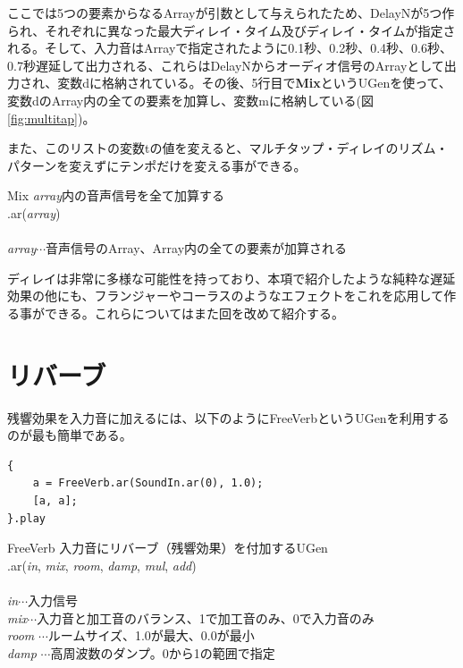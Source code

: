 \documentclass{jsarticle}
\begin{document}
ここでは5つの要素からなるArrayが引数として与えられたため、DelayNが5つ作られ、それぞれに異なった最大ディレイ・タイム及びディレイ・タイムが指定される。そして、入力音はArrayで指定されたように0.1秒、0.2秒、0.4秒、0.6秒、0.7秒遅延して出力される、これらはDelayNからオーディオ信号のArrayとして出力され、変数dに格納されている。その後、5行目で{\bf Mix}というUGenを使って、変数dのArray内の全ての要素を加算し、変数mに格納している(図\ref{fig:multitap})。

また、このリストの変数tの値を変えると、マルチタップ・ディレイのリズム・パターンを変えずにテンポだけを変える事ができる。

\begin{itembox}[l]{Mix}
{\footnotesize 
{\it array}内の音声信号を全て加算する\\
.ar({\it array})\\\\
{\it array}$\cdots$音声信号のArray、Array内の全ての要素が加算される\\
}
\end{itembox}

ディレイは非常に多様な可能性を持っており、本項で紹介したような純粋な遅延効果の他にも、フランジャーやコーラスのようなエフェクトをこれを応用して作る事ができる。これらについてはまた回を改めて紹介する。

\section{リバーブ}
残響効果を入力音に加えるには、以下のようにFreeVerbというUGenを利用するのが最も簡単である。

\begin{lstlisting}[caption=リバーブ, label=code:reverb]
{
	a = FreeVerb.ar(SoundIn.ar(0), 1.0);
	[a, a];
}.play
\end{lstlisting}

\begin{itembox}[l]{FreeVerb}
{\footnotesize 
入力音にリバーブ（残響効果）を付加するUGen\\
.ar({\it in}, {\it mix}, {\it room}, {\it damp}, {\it mul}, {\it add})\\\\
{\it in}$\cdots$入力信号\\
{\it mix}$\cdots$入力音と加工音のバランス、1で加工音のみ、0で入力音のみ\\
{\it room} $\cdots$ルームサイズ、1.0が最大、0.0が最小\\
{\it damp} $\cdots$高周波数のダンプ。0から1の範囲で指定\\
}
\end{itembox}
\end{document}
